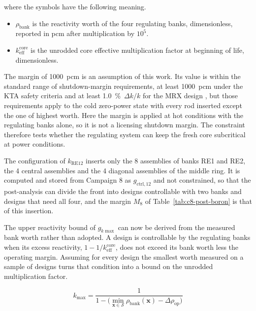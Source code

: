 \noindent where the symbols have the following meaning.

\begin{itemize}
  \item $\rho_\mathrm{bank}$ is the reactivity worth of the four
        regulating banks, dimensionless, reported in pcm after
        multiplication by $10^5$.

  \item $k_\mathrm{eff}^\mathrm{core}$ is the unrodded core effective
        multiplication factor at beginning of life, dimensionless.
\end{itemize}

The margin of \SI{1000}{pcm} is an assumption of this work. Its value
is within the standard range of shutdown-margin requirements, at least
\SI{1000}{pcm} under the KTA safety criteria
\cite{alzaben_boronfree_2019,song_sanchez_2026} and at least
\SI{1.0}{\%}~$\Delta k/k$ for the MRX design \cite{kusunoki_mrx_2000},
but those requirements apply to the cold zero-power state with every
rod inserted except the one of highest worth. Here the margin is applied
at hot conditions with the regulating banks alone, so it is not a
licensing shutdown margin. The constraint
therefore tests whether the regulating system can keep the fresh core subcritical at power conditions.

The configuration of $k_\mathrm{RE12}$ inserts only the 8
assemblies of banks RE1 and RE2, the 4 central assemblies and the
4 diagonal assemblies of the middle ring. It is computed and stored
from Campaign 8 as $g_\mathrm{ctrl,12}$ and not constrained, so that the
post-analysis can divide the front into designs controllable with two
banks and designs that need all four, and the margin $M_{8}$ of
Table~\ref{tab:c8-post-boron} is that of this insertion.

The upper reactivity bound of $g_{k\max}$ can now be derived from the
measured bank worth rather than adopted. A design is controllable by
the regulating banks when its excess reactivity,
$1 - 1/k_\mathrm{eff}^\mathrm{core}$, does not exceed its bank worth
less the operating margin. Assuming for every design the smallest worth
measured on a sample of designs turns that condition into a bound on the unrodded multiplication factor.

\begin{equation}
k_{\max} = \frac{1}{1 - \big(\min_{\mathbf{x} \in \mathcal{S}} \rho_\mathrm{bank}(\mathbf{x}) - \Delta\rho_\mathrm{op}\big)}
\label{eq:k-max-derived}
\end{equation}

